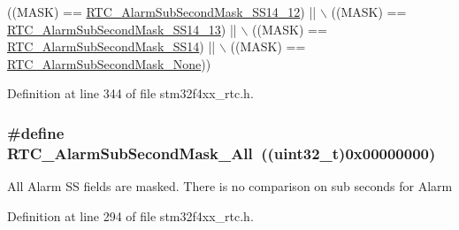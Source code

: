 \begin{DoxyCode}
                                              ((MASK) == 
      \hyperlink{group___r_t_c___alarm___sub___seconds___masks___definitions_ga21da05a4b786c38755ff01564a4de83b}{RTC\_AlarmSubSecondMask\_SS14\_12}) || \(\backslash\)
                                              ((MASK) == 
      \hyperlink{group___r_t_c___alarm___sub___seconds___masks___definitions_ga00430f0eae750c0d41339d0dca26a8e5}{RTC\_AlarmSubSecondMask\_SS14\_13}) || \(\backslash\)
                                              ((MASK) == 
      \hyperlink{group___r_t_c___alarm___sub___seconds___masks___definitions_ga8d5f1d8afee279f519dccca14522fe27}{RTC\_AlarmSubSecondMask\_SS14}) || \(\backslash\)
                                              ((MASK) == 
      \hyperlink{group___r_t_c___alarm___sub___seconds___masks___definitions_ga201f3ce456e20ffbc3f9af83c972aaa7}{RTC\_AlarmSubSecondMask\_None}))
\end{DoxyCode}


Definition at line 344 of file stm32f4xx\-\_\-rtc.\-h.

\hypertarget{group___r_t_c___alarm___sub___seconds___masks___definitions_ga7ca3d2cc7822e86a0397137400bff1e8}{
\subsubsection[{R\-T\-C\-\_\-\-Alarm\-Sub\-Second\-Mask\-\_\-\-All}]{\setlength{\rightskip}{0pt plus 5cm}\#define R\-T\-C\-\_\-\-Alarm\-Sub\-Second\-Mask\-\_\-\-All~((uint32\-\_\-t)0x00000000)}}\label{group___r_t_c___alarm___sub___seconds___masks___definitions_ga7ca3d2cc7822e86a0397137400bff1e8}
All Alarm S\-S fields are masked. There is no comparison on sub seconds for Alarm 

Definition at line 294 of file stm32f4xx\-\_\-rtc.\-h.

